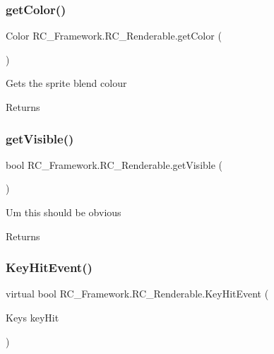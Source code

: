 \subsubsection{\texorpdfstring{get\+Color()}{getColor()}}
{\footnotesize\ttfamily Color R\+C\+\_\+\+Framework.\+R\+C\+\_\+\+Renderable.\+get\+Color (\begin{DoxyParamCaption}{ }\end{DoxyParamCaption})}



Gets the sprite blend colour 

\begin{DoxyReturn}{Returns}

\end{DoxyReturn}
\mbox{\label{class_r_c___framework_1_1_r_c___renderable_a6258a044f185b02adb80d441fd9f29b2}} 
\subsubsection{\texorpdfstring{get\+Visible()}{getVisible()}}
{\footnotesize\ttfamily bool R\+C\+\_\+\+Framework.\+R\+C\+\_\+\+Renderable.\+get\+Visible (\begin{DoxyParamCaption}{ }\end{DoxyParamCaption})}



Um this should be obvious 

\begin{DoxyReturn}{Returns}

\end{DoxyReturn}
\mbox{\label{class_r_c___framework_1_1_r_c___renderable_a826da9b07316c475186e4c2f00648827}} 
\subsubsection{\texorpdfstring{Key\+Hit\+Event()}{KeyHitEvent()}}
{\footnotesize\ttfamily virtual bool R\+C\+\_\+\+Framework.\+R\+C\+\_\+\+Renderable.\+Key\+Hit\+Event (\begin{DoxyParamCaption}\item[{Keys}]{key\+Hit }\end{DoxyParamCaption})\hspace{0.3cm}{\ttfamily [virtual]}}




